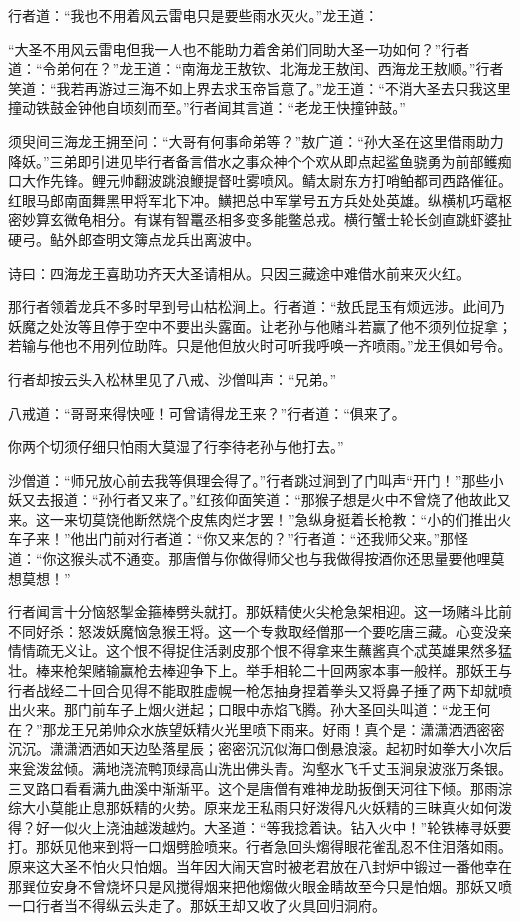 \documentclass[12pt,UTF8]{ctexbook}
\begin{document}
行者道：“我也不用着风云雷电只是要些雨水灭火。”龙王道：

“大圣不用风云雷电但我一人也不能助力着舍弟们同助大圣一功如何？”行者道：“令弟何在？”龙王道：“南海龙王敖钦、北海龙王敖闰、西海龙王敖顺。”行者笑道：“我若再游过三海不如上界去求玉帝旨意了。”龙王道：“不消大圣去只我这里撞动铁鼓金钟他自顷刻而至。”行者闻其言道：“老龙王快撞钟鼓。”

须臾间三海龙王拥至问：“大哥有何事命弟等？”敖广道：“孙大圣在这里借雨助力降妖。”三弟即引进见毕行者备言借水之事众神个个欢从即点起鲨鱼骁勇为前部鳠痴口大作先锋。鲤元帅翻波跳浪鯾提督吐雾喷风。鲭太尉东方打哨鲌都司西路催征。红眼马郎南面舞黑甲将军北下冲。鱑把总中军掌号五方兵处处英雄。纵横机巧鼋枢密妙算玄微龟相分。有谋有智鼍丞相多变多能鳖总戎。横行蟹士轮长剑直跳虾婆扯硬弓。鲇外郎查明文簿点龙兵出离波中。

诗曰：四海龙王喜助功齐天大圣请相从。只因三藏途中难借水前来灭火红。

那行者领着龙兵不多时早到号山枯松涧上。行者道：“敖氏昆玉有烦远涉。此间乃妖魔之处汝等且停于空中不要出头露面。让老孙与他赌斗若赢了他不须列位捉拿；若输与他也不用列位助阵。只是他但放火时可听我呼唤一齐喷雨。”龙王俱如号令。

行者却按云头入松林里见了八戒、沙僧叫声：“兄弟。”

八戒道：“哥哥来得快哑！可曾请得龙王来？”行者道：“俱来了。

你两个切须仔细只怕雨大莫湿了行李待老孙与他打去。”

沙僧道：“师兄放心前去我等俱理会得了。”行者跳过涧到了门叫声“开门！”那些小妖又去报道：“孙行者又来了。”红孩仰面笑道：“那猴子想是火中不曾烧了他故此又来。这一来切莫饶他断然烧个皮焦肉烂才罢！”急纵身挺着长枪教：“小的们推出火车子来！”他出门前对行者道：“你又来怎的？”行者道：“还我师父来。”那怪道：“你这猴头忒不通变。那唐僧与你做得师父也与我做得按酒你还思量要他哩莫想莫想！”

行者闻言十分恼怒掣金箍棒劈头就打。那妖精使火尖枪急架相迎。这一场赌斗比前不同好杀：怒泼妖魔恼急猴王将。这一个专救取经僧那一个要吃唐三藏。心变没亲情情疏无义让。这个恨不得捉住活剥皮那个恨不得拿来生蘸酱真个忒英雄果然多猛壮。棒来枪架赌输赢枪去棒迎争下上。举手相轮二十回两家本事一般样。那妖王与行者战经二十回合见得不能取胜虚幌一枪怎抽身捏着拳头又将鼻子捶了两下却就喷出火来。那门前车子上烟火迸起；口眼中赤焰飞腾。孙大圣回头叫道：“龙王何在？”那龙王兄弟帅众水族望妖精火光里喷下雨来。好雨！真个是：潇潇洒洒密密沉沉。潇潇洒洒如天边坠落星辰；密密沉沉似海口倒悬浪滚。起初时如拳大小次后来瓮泼盆倾。满地浇流鸭顶绿高山洗出佛头青。沟壑水飞千丈玉涧泉波涨万条银。三叉路口看看满九曲溪中渐渐平。这个是唐僧有难神龙助扳倒天河往下倾。那雨淙综大小莫能止息那妖精的火势。原来龙王私雨只好泼得凡火妖精的三昧真火如何泼得？好一似火上浇油越泼越灼。大圣道：“等我捻着诀。钻入火中！”轮铁棒寻妖要打。那妖见他来到将一口烟劈脸喷来。行者急回头煼得眼花雀乱忍不住泪落如雨。原来这大圣不怕火只怕烟。当年因大闹天宫时被老君放在八封炉中锻过一番他幸在那巽位安身不曾烧坏只是风搅得烟来把他煼做火眼金睛故至今只是怕烟。那妖又喷一口行者当不得纵云头走了。那妖王却又收了火具回归洞府。
\end{document}
